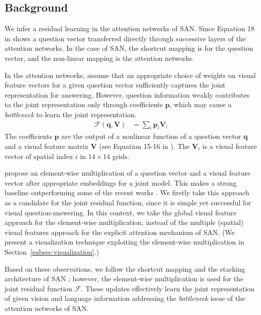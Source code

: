 \documentclass{article}
\newcommand{\vq}[0]{\mathbf{q}}
\newcommand{\vp}[0]{\mathbf{p}}
\newcommand{\mV}[0]{\mathbf{V}}
\begin{document}
\subsection{Background}
\label{subsec:background}

We infer a residual learning in the attention networks of SAN. Since Equation 18 in \cite{Yang2015} shows a question vector transferred directly through successive layers of the attention networks. In the case of SAN, the shortcut mapping is for the question vector, and the non-linear mapping is the attention networks.

In the attention networks, \citet{Yang2015} assume that an appropriate choice of weights on visual feature vectors for a given question vector sufficiently captures the joint representation for answering. However, question information weakly contributes to the joint representation only through coefficients $\vp$, which may cause a \textit{bottleneck} to learn the joint representation. \begin{align}
   \label{eq:san}
   \mathcal{F}(\vq,\mV) &= \sum_{i} \vp_{i} \mV_i
\end{align}
The coefficients $\vp$ are the output of a nonlinear function of a question vector $\vq$ and a visual feature matrix $\mV$ (see Equation 15-16 in \citet{Yang2015}). The $\mV_i$ is a visual feature vector of spatial index $i$ in $14 \times 14$ grids.

\citet{Lu2015} propose an element-wise multiplication of a question vector and a visual feature vector after appropriate embeddings for a joint model. This makes a strong baseline outperforming some of the recent works \cite{Noh2015,Andreas2016}. We firstly take this approach as a candidate for the joint residual function, since it is simple yet successful for visual question-answering. In this context, we take the global visual feature approach for the element-wise multiplication, instead of the multiple (spatial) visual features approach for the explicit attention mechanism of SAN. (We present a visualization technique exploiting the element-wise multiplication in Section~\ref{subsec:visualization}.)

Based on these observations, we follow the shortcut mapping and the stacking architecture of SAN \cite{Yang2015}; however, the element-wise multiplication is used for the joint residual function $\mathcal{F}$. These updates effectively learn the joint representation of given vision and language information addressing the \textit{bottleneck} issue of the attention networks of SAN.
\end{document}
